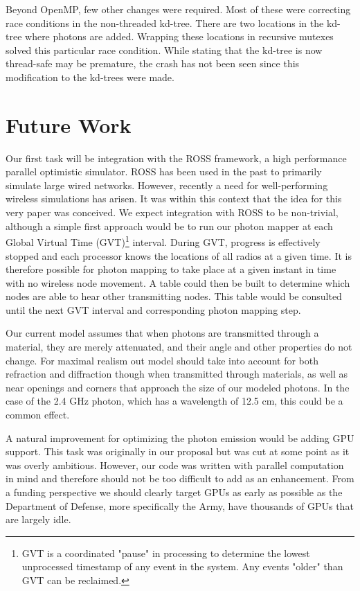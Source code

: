 \documentclass[%
        final,
        notitlepage,
        narroweqnarray,
        inline,
        twoside,
        ]{ieee}
\begin{document}
Beyond OpenMP, few other changes were required.  Most of these were correcting
race conditions in the non-threaded kd-tree.  There are two locations in the
kd-tree where photons are added.  Wrapping these locations in recursive
mutexes solved this particular race condition.  While stating that the kd-tree
is now thread-safe may be premature, the crash has not been seen since this
modification to the kd-trees were made.

\section{Future Work}

Our first task will be integration with the ROSS \cite{ross} framework, a high
performance parallel optimistic simulator.  ROSS has been used in the past to
primarily simulate large wired networks.  However, recently a need for
well-performing wireless simulations has arisen.  It was within this context
that the idea for this very paper was conceived.  We expect integration with
ROSS to be non-trivial, although a simple first approach would be to run our
photon mapper at each Global Virtual Time (GVT)\footnote{GVT is a coordinated
"pause" in processing to determine the lowest unprocessed timestamp of any
event in the system.  Any events "older" than GVT can be reclaimed.} interval.
During GVT, progress is effectively stopped and each processor knows the
locations of all radios at a given time.  It is therefore possible for photon
mapping to take place at a given instant in time with no wireless node movement.
A table could then be built to determine which nodes are able to hear other
transmitting nodes.  This table would be consulted until the next GVT interval
and corresponding photon mapping step.

Our current model assumes that when photons are transmitted through a material,
they are merely attenuated, and their angle and other properties do not change.
For maximal realism out model should take into account for both refraction and
diffraction though when transmitted through materials, as well as near openings and
corners that approach the size of our modeled photons. In the case of the 2.4 GHz photon,
which has a wavelength of 12.5 cm, this could be a common effect.

A natural improvement for optimizing the photon emission would be adding
GPU support.  This task was originally in our proposal but was cut at some
point as it was overly ambitious.  However, our code was written with
parallel computation in mind and therefore should not be too difficult to
add as an enhancement.  From a funding perspective we should clearly target
GPUs as early as possible as the Department of Defense, more specifically the
Army, have thousands of GPUs that are largely idle.
\end{document}
